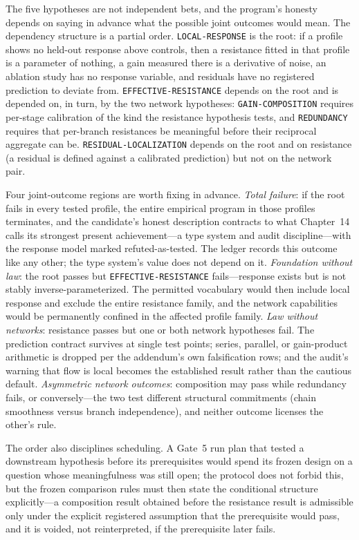 The five hypotheses are not independent bets, and the program's honesty depends on saying in advance what the possible joint outcomes would mean. The dependency structure is a partial order. \texttt{LOCAL-RESPONSE} is the root: if a profile shows no held-out response above controls, then a resistance fitted in that profile is a parameter of nothing, a gain measured there is a derivative of noise, an ablation study has no response variable, and residuals have no registered prediction to deviate from. \texttt{EFFECTIVE-RESISTANCE} depends on the root and is depended on, in turn, by the two network hypotheses: \texttt{GAIN-COMPOSITION} requires per-stage calibration of the kind the resistance hypothesis tests, and \texttt{REDUNDANCY} requires that per-branch resistances be meaningful before their reciprocal aggregate can be. \texttt{RESIDUAL-LOCALIZATION} depends on the root and on resistance (a residual is defined against a calibrated prediction) but not on the network pair.

Four joint-outcome regions are worth fixing in advance. \emph{Total failure}: if the root fails in every tested profile, the entire empirical program in those profiles terminates, and the candidate's honest description contracts to what Chapter~14 calls its strongest present achievement---a type system and audit discipline---with the response model marked refuted-as-tested. The ledger records this outcome like any other; the type system's value does not depend on it. \emph{Foundation without law}: the root passes but \texttt{EFFECTIVE-RESISTANCE} fails---response exists but is not stably inverse-parameterized. The permitted vocabulary would then include local response and exclude the entire resistance family, and the network capabilities would be permanently confined in the affected profile family. \emph{Law without networks}: resistance passes but one or both network hypotheses fail. The prediction contract survives at single test points; series, parallel, or gain-product arithmetic is dropped per the addendum's own falsification rows; and the audit's warning that flow is local becomes the established result rather than the cautious default. \emph{Asymmetric network outcomes}: composition may pass while redundancy fails, or conversely---the two test different structural commitments (chain smoothness versus branch independence), and neither outcome licenses the other's rule.

The order also disciplines scheduling. A Gate~5 run plan that tested a downstream hypothesis before its prerequisites would spend its frozen design on a question whose meaningfulness was still open; the protocol does not forbid this, but the frozen comparison rules must then state the conditional structure explicitly---a composition result obtained before the resistance result is admissible only under the explicit registered assumption that the prerequisite would pass, and it is voided, not reinterpreted, if the prerequisite later fails.


